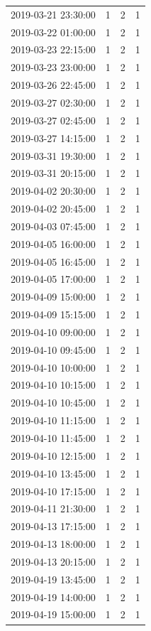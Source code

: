 \begin{tabular}{lrrr}
2019-03-21 23:30:00 & 1 & 2 & 1 \\
2019-03-22 01:00:00 & 1 & 2 & 1 \\
2019-03-23 22:15:00 & 1 & 2 & 1 \\
2019-03-23 23:00:00 & 1 & 2 & 1 \\
2019-03-26 22:45:00 & 1 & 2 & 1 \\
2019-03-27 02:30:00 & 1 & 2 & 1 \\
2019-03-27 02:45:00 & 1 & 2 & 1 \\
2019-03-27 14:15:00 & 1 & 2 & 1 \\
2019-03-31 19:30:00 & 1 & 2 & 1 \\
2019-03-31 20:15:00 & 1 & 2 & 1 \\
2019-04-02 20:30:00 & 1 & 2 & 1 \\
2019-04-02 20:45:00 & 1 & 2 & 1 \\
2019-04-03 07:45:00 & 1 & 2 & 1 \\
2019-04-05 16:00:00 & 1 & 2 & 1 \\
2019-04-05 16:45:00 & 1 & 2 & 1 \\
2019-04-05 17:00:00 & 1 & 2 & 1 \\
2019-04-09 15:00:00 & 1 & 2 & 1 \\
2019-04-09 15:15:00 & 1 & 2 & 1 \\
2019-04-10 09:00:00 & 1 & 2 & 1 \\
2019-04-10 09:45:00 & 1 & 2 & 1 \\
2019-04-10 10:00:00 & 1 & 2 & 1 \\
2019-04-10 10:15:00 & 1 & 2 & 1 \\
2019-04-10 10:45:00 & 1 & 2 & 1 \\
2019-04-10 11:15:00 & 1 & 2 & 1 \\
2019-04-10 11:45:00 & 1 & 2 & 1 \\
2019-04-10 12:15:00 & 1 & 2 & 1 \\
2019-04-10 13:45:00 & 1 & 2 & 1 \\
2019-04-10 17:15:00 & 1 & 2 & 1 \\
2019-04-11 21:30:00 & 1 & 2 & 1 \\
2019-04-13 17:15:00 & 1 & 2 & 1 \\
2019-04-13 18:00:00 & 1 & 2 & 1 \\
2019-04-13 20:15:00 & 1 & 2 & 1 \\
2019-04-19 13:45:00 & 1 & 2 & 1 \\
2019-04-19 14:00:00 & 1 & 2 & 1 \\
2019-04-19 15:00:00 & 1 & 2 & 1 \\

\end{tabular}
